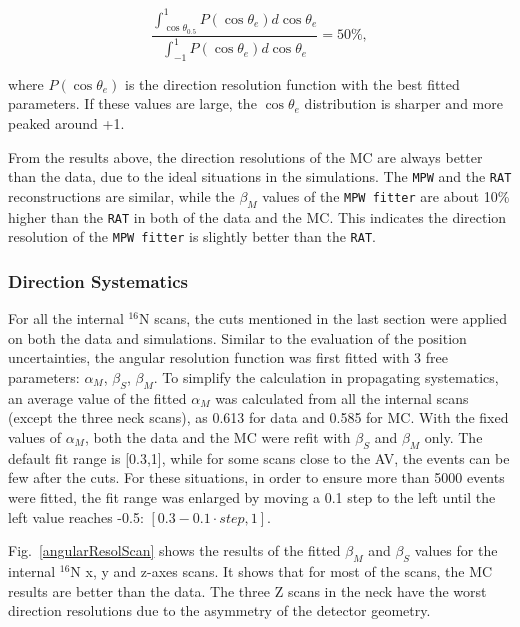 \begin{equation}\label{eq:cosTheta_e}
\frac{\int_{\cos\theta_{0.5}}^1 P(\cos\theta_e) d\cos\theta_e}{\int_{-1}^1 P(\cos\theta_e) d\cos\theta_e} = 50\%,
\end{equation}

where $P(\cos\theta_e)$ is the direction resolution function with the best fitted parameters. If these values are large, the $\cos\theta_e$ distribution is sharper and more peaked around +1.

From the results above, the direction resolutions of the MC are always better than the data, due to the ideal situations in the simulations. The \texttt{MPW} and the \texttt{RAT} reconstructions are similar, while the $\beta_M$ values of the \texttt{MPW fitter} are about 10\% higher than the \texttt{RAT} in both of the data and the MC. This indicates the direction resolution of the \texttt{MPW fitter} is slightly better than the \texttt{RAT}.

\subsubsection{Direction Systematics}
For all the internal $^{16}$N scans, the cuts mentioned in the last section were applied on both the data and simulations. Similar to the evaluation of the position uncertainties, the angular resolution function was first fitted with 3 free parameters: $\alpha_M$, $\beta_S$, $\beta_M$. To simplify the calculation in propagating systematics, an average value of the fitted $\alpha_M$ was calculated from all the internal scans (except the three neck scans), as 0.613 for data and 0.585 for MC. With the fixed values of $\alpha_M$, both the data and the MC were refit with $\beta_S$ and $\beta_M$ only. The default fit range is [0.3,1], while for some scans close to the AV, the events can be few after the cuts. For these situations, in order to ensure more than 5000 events were fitted, the fit range was enlarged by moving a 0.1 step to the left until the left value reaches -0.5: $[0.3-0.1\cdot step,1]$.

Fig.~\ref{angularResolScan} shows the results of the fitted $\beta_M$ and $\beta_S$ values for the internal $^{16}$N x, y and z-axes scans. It shows that for most of the scans, the MC results are better than the data. The three Z scans in the neck have the worst direction resolutions due to the asymmetry of the detector geometry. 

